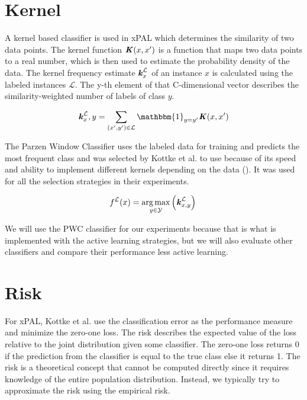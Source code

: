 \section{Kernel}

A kernel based classifier is used in xPAL which determines the similarity of two data points. The kernel function $\textbf{\textit{K}}(x,x')$ is a function that maps two data points to a real number, which is then used to estimate the probability density of the data. The kernel frequency estimate $\textbf{\textit{k}}^{\mathcal{L}}_x$ of an instance $x$ is calculated using the labeled instances $\mathcal{L}$. The y-th element of that C-dimensional vector describes the similarity-weighted number of labels of class $y$.

\begin{equation}
\textbf{\textit{k}}^{\mathcal{L}}_x,y = \sum_{(x',y') \in \mathcal{L}} \mathbbm{1}_{y=y'} \textbf{\textit{K}}(x,x')
\label{eq:kernel}
\end{equation}

The Parzen Window Classifier uses the labeled data for training and predicts the most frequent class and was selected by Kottke et al. to use because of its speed and ability to implement different kernels depending on the data (\cite{kottke2021toward}). It was used for all the selection strategies in their experiments. 

\begin{equation}
f^{\mathcal{L}}(x) = \underset{y \in \mathcal{Y}}{\arg \max} \left( \textbf{\textit{k}}^{\mathcal{L}}_{x,y} \right) \\
\end{equation}

We will use the PWC classifier for our experiments because that is what is implemented with the active learning strategies, but we will also evaluate other classifiers and compare their performance less active learning.

\section{Risk}

For xPAL, Kottke et al. use the classification error as the performance measure and minimize the zero-one loss. The risk describes the expected value of the loss relative to the joint distribution given some classifier. The zero-one loss returns 0 if the prediction from the classifier is equal to the true class else it returns 1. The risk is a theoretical concept that cannot be computed directly since it requires knowledge of the entire population distribution. Instead, we typically try to approximate the risk using the empirical risk.

